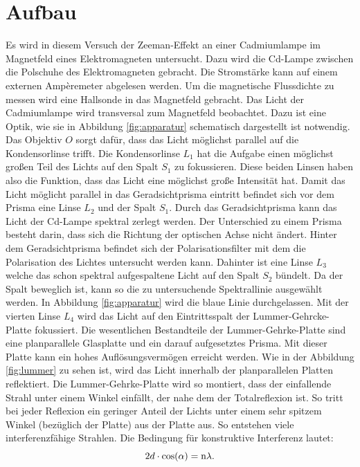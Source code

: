 \section{Aufbau}
\label{sec:Aufbau}
Es wird in diesem Versuch der Zeeman-Effekt an einer Cadmiumlampe im Magnetfeld
eines Elektromagneten untersucht.
Dazu wird die Cd-Lampe zwischen die Polschuhe des Elektromagneten gebracht. Die
Stromstärke kann auf einem externen Ampèremeter abgelesen werden. Um die
magnetische Flussdichte zu messen wird eine Hallsonde in das Magnetfeld gebracht.
Das Licht der Cadmiumlampe wird transversal zum Magnetfeld beobachtet. Dazu ist eine
Optik, wie sie in Abbildung \ref{fig:apparatur} schematisch dargestellt ist notwendig.
Das Objektiv $O$ sorgt dafür, dass das Licht möglichst parallel auf die Kondensorlinse
trifft. Die Kondensorlinse $L_\text{1}$ hat die Aufgabe einen möglichst großen Teil des Lichts
auf den Spalt $S_\text{1}$ zu fokussieren. Diese beiden Linsen haben also die Funktion, dass
das Licht eine möglichst große Intensität hat. Damit das Licht möglicht parallel
in das Geradsichtprisma eintritt befindet sich vor dem Prisma eine Linse $L_\text{2}$
und der Spalt $S_\text{1}$. Durch das Geradsichtprisma kann das Licht der Cd-Lampe
spektral zerlegt werden. Der Unterschied zu einem Prisma besteht darin, dass sich
die Richtung der optischen Achse nicht ändert. Hinter dem Geradsichtprisma befindet sich
der Polarisationsfilter mit dem die Polarisation des Lichtes untersucht werden kann.
Dahinter ist eine Linse $L_\text{3}$ welche das schon spektral aufgespaltene Licht
auf den Spalt $S_\text{2}$ bündelt. Da der Spalt beweglich ist, kann so die zu
untersuchende Spektrallinie ausgewählt werden. In Abbildung \ref{fig:apparatur}
wird die blaue Linie durchgelassen. Mit der vierten Linse $L_\text{4}$
wird das Licht auf den Eintrittsspalt der Lummer-Gehrcke-Platte fokussiert.
Die wesentlichen Bestandteile der Lummer-Gehrke-Platte sind eine planparallele
Glasplatte und ein darauf aufgesetztes Prisma. Mit dieser Platte kann ein hohes
Auflösungsvermögen erreicht werden. Wie in der Abbildung \ref{fig:lummer} zu sehen
ist, wird das Licht innerhalb der planparallelen Platten reflektiert. Die
Lummer-Gehrke-Platte wird so montiert, dass der einfallende Strahl unter einem Winkel
einfällt, der nahe dem der Totalreflexion ist. So tritt bei jeder Reflexion ein
geringer Anteil der Lichts unter einem sehr spitzem Winkel (bezüglich der Platte)
aus der Platte aus. So entstehen viele interferenzfähige Strahlen. Die Bedingung
für konstruktive Interferenz lautet:
\begin{equation}
  2d \cdot \cos(\alpha) = \text{n} \lambda \\.
\end{equation}
